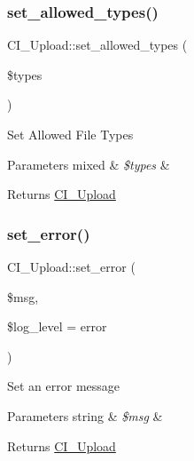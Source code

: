 \subsubsection{\texorpdfstring{set\+\_\+allowed\+\_\+types()}{set\_allowed\_types()}}
{\footnotesize\ttfamily C\+I\+\_\+\+Upload\+::set\+\_\+allowed\+\_\+types (\begin{DoxyParamCaption}\item[{}]{\$types }\end{DoxyParamCaption})}

Set Allowed File Types


\begin{DoxyParams}[1]{Parameters}
mixed & {\em \$types} & \\
\hline
\end{DoxyParams}
\begin{DoxyReturn}{Returns}
\mbox{\hyperlink{class_c_i___upload}{C\+I\+\_\+\+Upload}} 
\end{DoxyReturn}
\mbox{\label{class_c_i___upload_ab4b85f042b2d2d36c360a39dd8e97fe2}} 
\subsubsection{\texorpdfstring{set\+\_\+error()}{set\_error()}}
{\footnotesize\ttfamily C\+I\+\_\+\+Upload\+::set\+\_\+error (\begin{DoxyParamCaption}\item[{}]{\$msg,  }\item[{}]{\$log\+\_\+level = {\ttfamily \textquotesingle{}error\textquotesingle{}} }\end{DoxyParamCaption})}

Set an error message


\begin{DoxyParams}[1]{Parameters}
string & {\em \$msg} & \\
\hline
\end{DoxyParams}
\begin{DoxyReturn}{Returns}
\mbox{\hyperlink{class_c_i___upload}{C\+I\+\_\+\+Upload}} 
\end{DoxyReturn}
\mbox{\label{class_c_i___upload_a5c50a01f848fa3a12022e82d6a8ae340}} 
